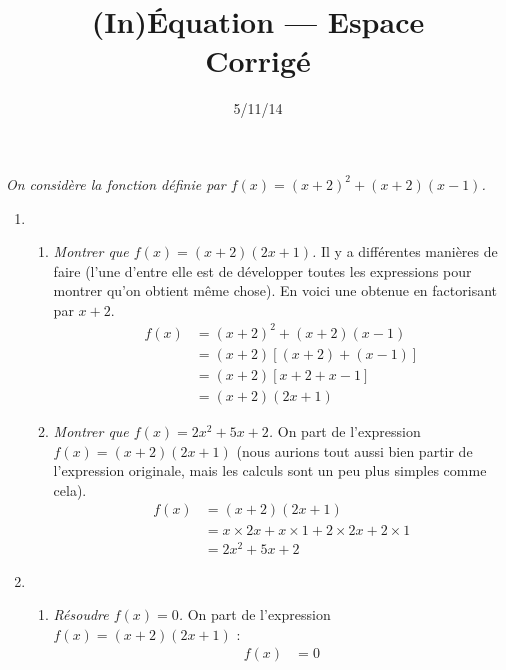 \documentclass[12pt]{article}
\title{{\small (In)Équation --- Espace}\\ Corrigé}
\date{5/11/14}
\begin{document}
\maketitle

\begin{exercice}
  \emph{On considère la fonction définie par $f(x)=\left( x+2 \right)^2+\left( x+2 \right)\left( x-1 \right)$.}

  \begin{enumerate}[(1)]
    \item \begin{enumerate}

        \item \emph{Montrer que $f(x)=\left( x+2 \right)\left( 2x+1 \right)$.}
          Il y a différentes manières de faire (l'une d'entre elle est de développer toutes les expressions pour montrer qu'on obtient même chose). En voici une obtenue en factorisant par $x+2$.
          \begin{align*}
            f(x)&=\left( x+2 \right)^2+\left( x+2 \right)\left( x-1 \right)\\
            &=\left( x+2 \right)\left[\left( x+2 \right)+\left( x-1 \right)\right]\\
            &=\left( x+2 \right)\left[ x+2+x-1 \right]\\
            &=\left( x+2 \right)\left( 2x+1 \right)
          \end{align*}
        \item \emph{Montrer que $f(x)=2x^2+5x+2$.} On part de l'expression $f(x)=\left( x+2 \right)\left( 2x+1 \right)$ (nous aurions tout aussi bien partir de l'expression originale, mais les calculs sont un peu plus simples comme cela).
          \begin{align*}
            f(x) &= \left( x+2 \right)\left( 2x+1 \right)\\
            &= x\times2x+x\times1+2\times2x+2\times1\\
            &= 2x^2+5x+2
          \end{align*}
      \end{enumerate}
    \item \begin{enumerate}
          \pagebreak
        \item \emph{Résoudre $f(x)=0$.} On part de l'expression $f(x)=\left( x+2 \right)\left( 2x+1 \right)$ :
          \begin{align*}
            f(x) &=0\\

\end{align*}
\end{enumerate}
\end{enumerate}
\end{exercice}
\end{document}
